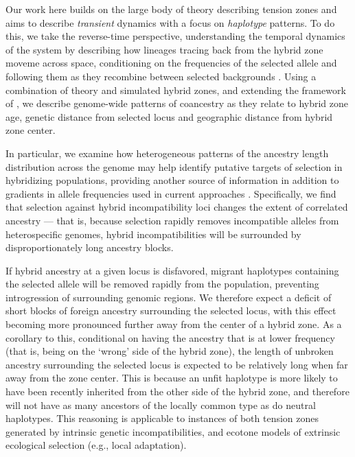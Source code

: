 \documentclass[11pt,letterpaper]{article}
\begin{document}
Our work here builds on the large body of theory describing tension zones 
and aims to describe \emph{transient} dynamics with a focus on \emph{haplotype} patterns.
To do this, we take the reverse-time perspective,
understanding the temporal dynamics of the system by describing how lineages tracing back from the hybrid zone
moveme across space, conditioning on the frequencies of the selected allele and following them as they recombine between selected backgrounds
\citep[similar to][]{hudson1988coalescent}.
Using a combination of theory and simulated hybrid zones, 
and extending the framework of \citet{sedghifar2015spatial},
we describe genome-wide patterns of coancestry 
as they relate to hybrid zone age, genetic distance from selected locus and geographic distance from hybrid zone center. 

In particular, we examine how heterogeneous patterns of the ancestry length distribution across the genome 
may help identify putative targets of selection in hybridizing populations, 
providing another source of information in addition to gradients in allele frequencies used in current approaches \citep[e.g.,][]{Porter1997, Gompert2012}. 
Specifically, we find that selection against hybrid incompatibility loci changes the extent of correlated ancestry --- that is, 
because selection rapidly removes incompatible alleles from heterospecific genomes, hybrid incompatibilities will be surrounded by disproportionately long ancestry blocks.


If hybrid ancestry at a given locus is disfavored, migrant haplotypes containing the selected allele will be removed rapidly from the population, preventing introgression of surrounding genomic regions. We therefore expect a deficit of short blocks of foreign ancestry surrounding the selected locus, with this effect becoming more pronounced further away from the center of a hybrid zone. As a corollary to this, conditional on having the ancestry that is at lower frequency (that is, being on the `wrong' side of the hybrid zone), the length of unbroken ancestry surrounding the selected locus is expected to be relatively long when far away from the zone center.  
This is because an unfit haplotype is more likely to have been recently inherited from the other side of the hybrid zone, 
and therefore will not have as many ancestors of the locally common type as do neutral haplotypes. 
This reasoning is applicable to instances of both tension zones generated by intrinsic genetic incompatibilities, and ecotone models of extrinsic ecological selection (e.g., local adaptation).
\end{document}
